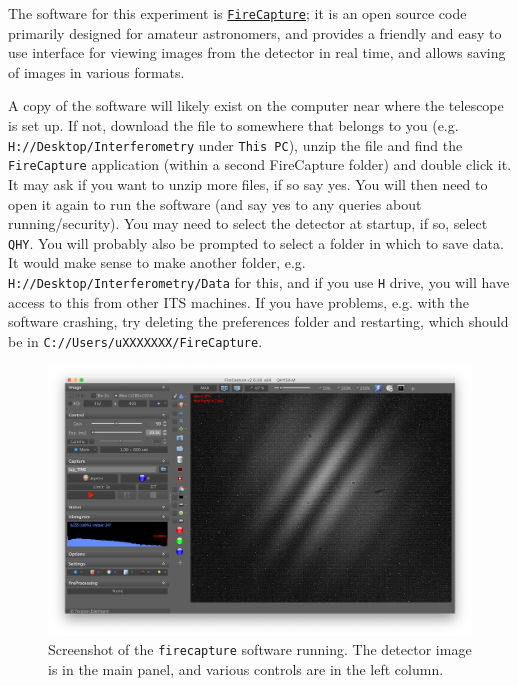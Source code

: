 \documentclass[11pt]{article}
\begin{document}
The software for this experiment is \href{http://www.firecapture.de/}{\texttt{FireCapture}}; it is an open source code primarily designed for amateur astronomers, and provides a friendly and easy to use interface for viewing images from the detector in real time, and allows saving of images in various formats.

A copy of the software will likely exist on the computer near where the telescope is set up. If not, download the file to somewhere that belongs to you (e.g. \texttt{H://Desktop/Interferometry} under \texttt{This PC}), unzip the file and find the \texttt{FireCapture} application (within a second FireCapture folder) and double click it. It may ask if you want to unzip more files, if so say yes. You will then need to open it again to run the software (and say yes to any queries about running/security). You may need to select the detector at startup, if so, select \texttt{QHY}. You will probably also be prompted to select a folder in which to save data. It would make sense to make another folder, e.g. \texttt{H://Desktop/Interferometry/Data} for this, and if you use \texttt{H} drive, you will have access to this from other ITS machines. If you have problems, e.g. with the software crashing, try deleting the preferences folder and restarting, which should be in \texttt{C://Users/uXXXXXXX/FireCapture}.

\begin{figure}[h]
    \centering
    \includegraphics[width=1\textwidth]{doc/fc.png}
    \caption{Screenshot of the \texttt{firecapture} software running. The detector image is in the main panel, and various controls are in the left column.}
    \label{fig:fc}
\end{figure}
\end{document}
